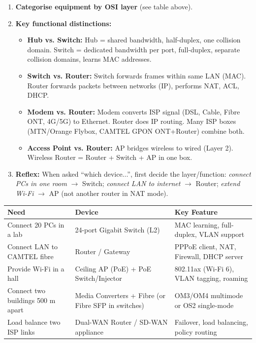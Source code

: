 \documentclass[11pt]{article}
\begin{document}
\begin{methode}
\begin{enumerate}
\item \textbf{Categorise equipment by OSI layer} (see table above).
\item \textbf{Key functional distinctions:}
      \begin{itemize}
      \item \textbf{Hub vs. Switch:} Hub = shared bandwidth, half-duplex, one collision domain. Switch = dedicated bandwidth per port, full-duplex, separate collision domains, learns MAC addresses.
      \item \textbf{Switch vs. Router:} Switch forwards frames within same LAN (MAC). Router forwards packets between networks (IP), performs NAT, ACL, DHCP.
      \item \textbf{Modem vs. Router:} Modem converts ISP signal (DSL, Cable, Fibre ONT, 4G/5G) to Ethernet. Router does IP routing. Many ISP boxes (MTN/Orange Flybox, CAMTEL GPON ONT+Router) combine both.
      \item \textbf{Access Point vs. Router:} AP bridges wireless to wired (Layer 2). Wireless Router = Router + Switch + AP in one box.
      \end{itemize}
\item \textbf{Reflex:} When asked ``which device...'', first decide the layer/function: \emph{connect PCs in one room} $\rightarrow$ Switch; \emph{connect LAN to internet} $\rightarrow$ Router; \emph{extend Wi-Fi} $\rightarrow$ AP (not another router in NAT mode).
\end{enumerate}
\end{methode}

\begin{exemplebox}
\begin{center}
\begin{tabularx}{\linewidth}{|l|l|X|}\hline
\rowcolor{popblueL}
\textbf{Need} & \textbf{Device} & \textbf{Key Feature} \\ \hline
Connect 20 PCs in a lab & 24-port Gigabit Switch (L2) & MAC learning, full-duplex, VLAN support \\ \hline
Connect LAN to CAMTEL fibre & Router / Gateway & PPPoE client, NAT, Firewall, DHCP server \\ \hline
Provide Wi-Fi in a hall & Ceiling AP (PoE) + PoE Switch/Injector & 802.11ax (Wi-Fi 6), VLAN tagging, roaming \\ \hline
Connect two buildings 500 m apart & Media Converters + Fibre (or Fibre SFP in switches) & OM3/OM4 multimode or OS2 single-mode \\ \hline
Load balance two ISP links & Dual-WAN Router / SD-WAN appliance & Failover, load balancing, policy routing \\ \hline
\end{tabularx}
\end{center}
\end{exemplebox}
\end{document}
